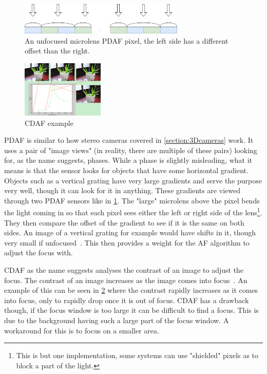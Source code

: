 \begin{figure}
    \centering
        \includegraphics[width=0.7\textwidth]{figures/pdaf_sensor.png}
        \caption{An unfocused microlens PDAF pixel, the left side has a
        different offset than the right.}
        \label{fig:pdaf}
\end{figure}

\pagebreak
\begin{figure}
    \begin{center}
        \includegraphics[width=0.35\textwidth]{figures/cdaf.png}
    \end{center}
    \caption{CDAF example~\cite{xu2011robust}}\label{fig:cdaf}
\end{figure}
PDAF is similar to how stereo cameras covered in \cref{section:3Dcameras}
work. It uses a pair of "image views" (in reality, there are multiple of these pairs)
looking for, as the name suggests, phases. While a phase is slightly
misleading, what it means is that the sensor looks for objects that have some
horizontal gradient. Objects such as a vertical grating have very large
gradients and serve the purpose very well, though it can look for it in
anything. These gradients are viewed through two PDAF sensors like in
\cref{fig:pdaf}. The "large" microlens above the pixel bends the light coming
in so that each pixel sees either the left or right side of the
lens\footnote{This is but one implementation, some systems can use "shielded"
pixels as to block a part of the light.}. They then compare the offset of the
gradient to see if it is the same on both sides. An image of a vertical
grating for example would have shifts in it, though very small if unfocused~\cite{pdafPatent}.
This then provides a weight for the AF algorithm to adjust the focus with.

CDAF as the name suggests analyses the contrast of an image to adjust the
focus. The contrast of an image increases as the image comes into focus~\cite{xu2011robust}.
An example of this can be seen in \cref{fig:cdaf} where the contrast rapidly
increases as it comes into focus, only to rapidly drop once it is out of focus.
CDAF has a drawback though, if the focus window is too large it can be difficult
to find a focus. This is due to the background having such a large part of the
focus window. A workaround for this is to focus on a smaller area.

